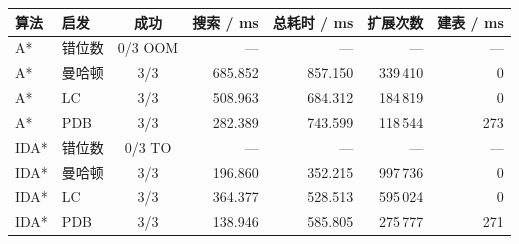 \begin{tabular}{llcrrrr}
\toprule
\textbf{算法} & \textbf{启发} & \textbf{成功} & \textbf{搜索 / ms} & \textbf{总耗时 / ms} & \textbf{扩展次数} & \textbf{建表 / ms} \\
\midrule
A* & 错位数 & 0/3 OOM & --- & --- & --- & --- \\
A* & 曼哈顿 & 3/3 & 685.852 & 857.150 & 339\,410 & 0 \\
A* & LC & 3/3 & 508.963 & 684.312 & 184\,819 & 0 \\
A* & PDB & 3/3 & 282.389 & 743.599 & 118\,544 & 273 \\
IDA* & 错位数 & 0/3 TO & --- & --- & --- & --- \\
IDA* & 曼哈顿 & 3/3 & 196.860 & 352.215 & 997\,736 & 0 \\
IDA* & LC & 3/3 & 364.377 & 528.513 & 595\,024 & 0 \\
IDA* & PDB & 3/3 & 138.946 & 585.805 & 275\,777 & 271 \\
\bottomrule
\end{tabular}
